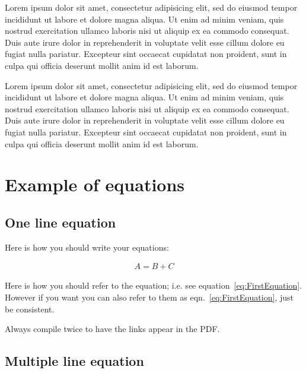 Lorem ipsum dolor sit amet, consectetur adipisicing elit, sed do eiusmod tempor
incididunt ut labore et dolore magna aliqua. Ut enim ad minim veniam, quis
nostrud exercitation ullamco laboris nisi ut aliquip ex ea commodo consequat.
Duis aute irure dolor in reprehenderit in voluptate velit esse cillum dolore eu
fugiat nulla pariatur. Excepteur sint occaecat cupidatat non proident, sunt in
culpa qui officia deserunt mollit anim id est laborum.

Lorem ipsum dolor sit amet, consectetur adipisicing elit, sed do eiusmod tempor
incididunt ut labore et dolore magna aliqua. Ut enim ad minim veniam, quis
nostrud exercitation ullamco laboris nisi ut aliquip ex ea commodo consequat.
Duis aute irure dolor in reprehenderit in voluptate velit esse cillum dolore eu
fugiat nulla pariatur. Excepteur sint occaecat cupidatat non proident, sunt in
culpa qui officia deserunt mollit anim id est laborum.

\section{Example of equations}

\subsection{One line equation}

Here is how you should write your equations:

\begin{align}
A=B+C
\label{eq:FirstEquation}
\end{align}

Here is how you should refer to the equation; i.e. see
equation~\ref{eq:FirstEquation}. However if you want you can also refer to them
as eqn.~\eqref{eq:FirstEquation}, just be consistent.

Always compile twice to have the links appear in the PDF.

\subsection{Multiple line equation}

